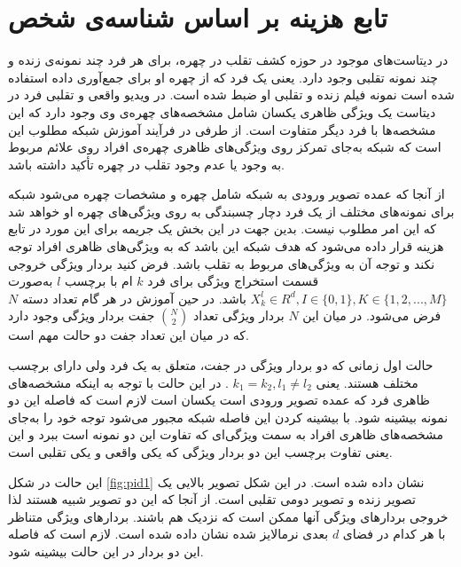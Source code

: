 \section{تابع هزینه بر اساس شناسه‌ی شخص}
در دیتاست‌های موجود در حوزه کشف تقلب در چهره، برای هر فرد چند نمونه‌ی زنده و چند نمونه تقلبی وجود دارد. یعنی یک فرد که از چهره او برای جمع‌آوری داده استفاده شده است نمونه فیلم زنده و تقلبی او ضبط شده است. در ویدیو واقعی و تقلبی فرد در دیتاست یک ویژگی ظاهری یکسان شامل مشخصه‌های چهره‌ی وی وجود دارد که این مشخصه‌ها با فرد دیگر متفاوت است. از طرفی در فرآیند آموزش شبکه مطلوب این است که شبکه به‌جای تمرکز روی ویژگی‌های ظاهری چهره‌ی افراد روی علائم مربوط به وجود یا عدم وجود تقلب در چهره تأکید داشته باشد.

از آنجا که عمده تصویر ورودی به شبکه شامل چهره و مشخصات چهره می‌شود شبکه برای نمونه‌های مختلف از یک فرد دچار چسبندگی به روی ویژگی‌های چهره او خواهد شد که این امر مطلوب نیست.       
بدین جهت در این بخش یک جریمه برای این مورد در تابع هزینه قرار داده می‌شود که هدف شبکه این باشد که به ویژگی‌های ظاهری افراد توجه نکند و توجه آن به ویژگی‌های مربوط به تقلب باشد. فرض کنید بردار ویژگی خروجی قسمت استخراج ویژگی برای فرد $k$ ام با برچسب $l$ به‌صورت 
$X_k^l \in R^d , I \in \{0,1\}, K \in \{1,2,...,M\}$
 باشد.
در حین آموزش در هر گام تعداد دسته
 $N$ 
فرض می‌شود. در میان این $N$ بردار ویژگی تعداد 
${N\choose 2}$
  جفت بردار ویژگی وجود دارد که در میان این تعداد جفت دو حالت مهم است.
  
  حالت اول زمانی که دو بردار ویژگی در جفت، متعلق به یک فرد ولی دارای برچسب مختلف هستند. یعنی 
  $k_1=k_2 , l_1 \ne l_2 $
  . در این حالت با توجه به اینکه مشخصه‌های ظاهری فرد که عمده تصویر ورودی است یکسان است لازم است که فاصله این دو نمونه بیشینه شود. با بیشینه کردن این فاصله شبکه مجبور می‌شود توجه خود را به‌جای مشخصه‌های ظاهری افراد به سمت ویژگی‌ای که تفاوت این دو نمونه است ببرد و این یعنی تفاوت برچسب این دو بردار ویژگی که یکی واقعی و یکی تقلبی است. 
  
  این حالت در شکل
\ref{fig:pid1}
  نشان داده شده است. در این شکل تصویر بالایی یک تصویر زنده و تصویر دومی تقلبی است. از آنجا که این دو تصویر شبیه هستند لذا خروجی بردارهای ویژگی آنها ممکن است که نزدیک هم باشند. بردارهای ویژگی متناظر با هر کدام در فضای $d$ بعدی نرمالایز شده نشان داده شده‌ است. لازم است که فاصله این دو بردار در این حالت بیشینه شود.
  
